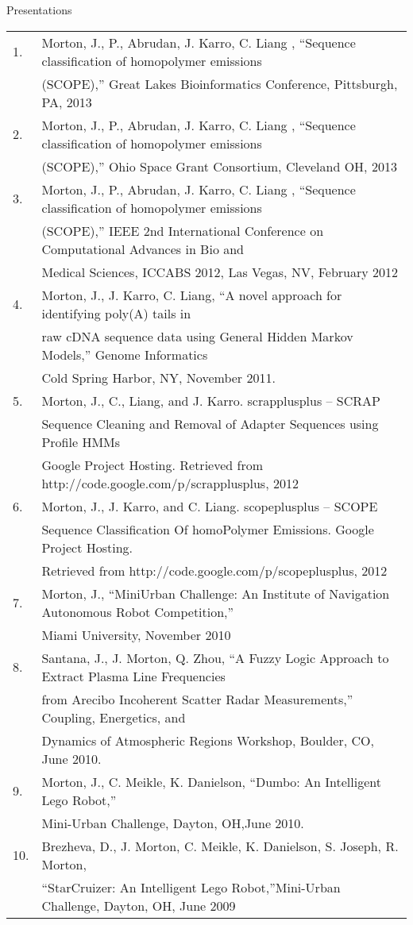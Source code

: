 \documentclass{resume} %
\begin{document}
\begin{rSection}{Presentations}
  \begin{tabular}{ll}
    1.  & Morton, J., P., Abrudan, J. Karro, C. Liang , “Sequence classification of homopolymer emissions \\
        & (SCOPE),” Great Lakes Bioinformatics Conference, Pittsburgh, PA, 2013\\
    2.  & Morton, J., P., Abrudan, J. Karro, C. Liang , “Sequence classification of homopolymer emissions \\
        & (SCOPE),” Ohio Space Grant Consortium, Cleveland OH, 2013\\
    3.  & Morton, J., P., Abrudan, J. Karro, C. Liang , “Sequence classification of homopolymer emissions \\
        & (SCOPE),” IEEE 2nd International Conference on Computational Advances in Bio and \\
        & Medical Sciences, ICCABS 2012, Las Vegas, NV, February 2012\\
    4.  & Morton, J., J. Karro, C. Liang, “A novel approach for identifying poly(A) tails in \\
        & raw cDNA sequence data using General Hidden Markov Models,” Genome Informatics \\
        & Cold Spring Harbor, NY, November 2011.\\
    5.  & Morton, J., C., Liang, and J. Karro. scrapplusplus -- SCRAP \\
        & Sequence Cleaning and Removal of Adapter Sequences using Profile HMMs\\
        & Google Project Hosting. Retrieved from http://code.google.com/p/scrapplusplus, 2012\\
    6.  & Morton, J., J. Karro, and C. Liang. scopeplusplus -- SCOPE \\
        & Sequence Classification Of homoPolymer Emissions. Google Project Hosting.\\
        & Retrieved from http://code.google.com/p/scopeplusplus, 2012\\
    7.  & Morton, J., “MiniUrban Challenge: An Institute of Navigation Autonomous Robot Competition,”\\
        & Miami University, November 2010 \\
    8.  & Santana, J., J. Morton, Q. Zhou, “A Fuzzy Logic Approach to Extract Plasma Line Frequencies\\
        & from Arecibo Incoherent Scatter Radar Measurements,” Coupling, Energetics, and \\
        & Dynamics of Atmospheric Regions Workshop, Boulder, CO, June 2010.\\
    9.  & Morton, J., C. Meikle, K. Danielson, “Dumbo: An Intelligent Lego Robot,”\\
        & Mini-Urban Challenge, Dayton, OH,June 2010.\\
    10.  & Brezheva, D., J. Morton, C. Meikle, K. Danielson, S. Joseph, R. Morton,\\
        & “StarCruizer: An Intelligent Lego Robot,”Mini-Urban Challenge, Dayton, OH, June 2009\\
  \end{tabular}
\end{rSection}
\end{document}
